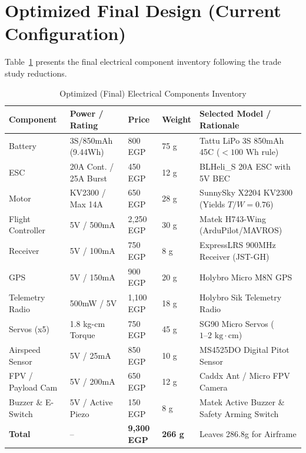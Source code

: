 \documentclass[12pt,a4paper]{article}
\begin{document}
\section{Optimized Final Design (Current Configuration)}
Table~\ref{tab:optimized_inventory} presents the final electrical component inventory following the trade study reductions.
\begin{table}[H]
\centering
\caption{Optimized (Final) Electrical Components Inventory}
\label{tab:optimized_inventory}
\footnotesize
\setlength{\tabcolsep}{3pt}
\begin{tabularx}{\textwidth}{@{}p{3.0cm} p{2.8cm} p{1.8cm} p{1.4cm} X@{}}
\toprule
\textbf{Component} & \textbf{Power / Rating} & \textbf{Price} & \textbf{Weight} & \textbf{Selected Model / Rationale} \\ \midrule
Battery            & 3S/850mAh (9.44Wh)     & 800 EGP   & 75 g  & Tattu LiPo 3S 850mAh 45C ($< 100\text{ Wh}$ rule) \\
ESC                & 20A Cont. / 25A Burst  & 450 EGP   & 12 g  & BLHeli\_S 20A ESC with 5V BEC \\
Motor              & KV2300 / Max 14A       & 650 EGP   & 28 g  & SunnySky X2204 KV2300 (Yields $T/W = 0.76$) \\
Flight Controller  & 5V / 500mA             & 2,250 EGP & 30 g  & Matek H743-Wing (ArduPilot/MAVROS) \\
Receiver           & 5V / 100mA             & 750 EGP   & 8 g   & ExpressLRS 900MHz Receiver (JST-GH) \\
GPS                & 5V / 150mA             & 900 EGP   & 20 g  & Holybro Micro M8N GPS \\
Telemetry Radio    & 500mW / 5V             & 1,100 EGP & 18 g  & Holybro Sik Telemetry Radio \\
Servos (x5)        & 1.8 kg-cm Torque       & 750 EGP   & 45 g  & SG90 Micro Servos ($1\text{--}2\text{ kg}\cdot\text{cm}$) \\
Airspeed Sensor    & 5V / 25mA              & 850 EGP   & 10 g  & MS4525DO Digital Pitot Sensor \\
FPV / Payload Cam  & 5V / 200mA             & 650 EGP   & 12 g  & Caddx Ant / Micro FPV Camera \\
Buzzer \& E-Switch & 5V / Active Piezo      & 150 EGP   & 8 g   & Matek Active Buzzer \& Safety Arming Switch \\ \midrule
\textbf{Total}     & --                     & \textbf{9,300 EGP} & \textbf{266 g} & Leaves 286.8g for Airframe \\ \bottomrule
\end{tabularx}
\end{table}
\end{document}
